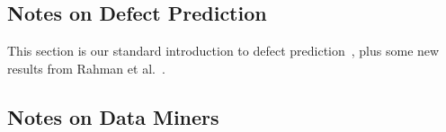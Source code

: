 \documentclass[smallextended]{svjour3}
\newcommand{\fig}[1]{Figure~\ref{fig:#1}}
\begin{document}
 






 


 
 

\subsection{Notes on Defect Prediction}


This section is our standard introduction to defect prediction~\cite{me15:book1},
plus    some new results from Rahman et al.~\cite{rahman14:icse}. 
 





 

 \subsection{Notes on Data Miners}
 
\end{document}
